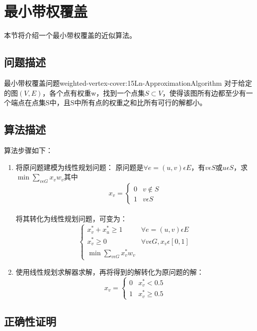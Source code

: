 \section{最小带权覆盖}

本节将介绍一个最小带权覆盖的近似算法。

\subsection{问题描述}

\begin{definition}{最小带权覆盖问题}{weighted-vertex-cover:15Ln-ApproximationAlgorithm}
	对于给定的图$(V,E)$，各个点有权重w，找到一个点集$S\subset V$，使得该图所有边都至少有一个端点在点集S中，且S中所有点的权重之和比所有可行的解都小。
\end{definition}

\subsection{算法描述}

算法步骤如下：
\begin{enumerate}
	\item 将原问题建模为线性规划问题：
	原问题是$\forall e=(u,v)\epsilon E$，有$v\epsilon S$或$u\epsilon S$，求$\min \sum\limits_{v\epsilon G} x_vw_v$其中
	\[
		x_v = \begin{cases}
			0 & v\notin S \\
			1 & v\epsilon S
		\end{cases}
	\]\\
	将其转化为线性规划问题，可变为：
	\[
		\begin{cases}
			x_v^*+x_u^*\geqslant 1 			   &\forall e=(u,v)\epsilon E\\
			x_v^*\geqslant 0	   			   &\forall v\epsilon G, x_v\epsilon [0,1]\\
			\min \sum\limits_{v\epsilon G} x_v^*w_v
		\end{cases}
	\]
	\item 使用线性规划求解器求解，再将得到的解转化为原问题的解：
	\[
		x_v=\begin{cases}
			0 &x_v^*<0.5\\
			1 &x_v^*\geqslant 0.5
		\end{cases}
	\]
\end{enumerate}

\subsection{正确性证明}

